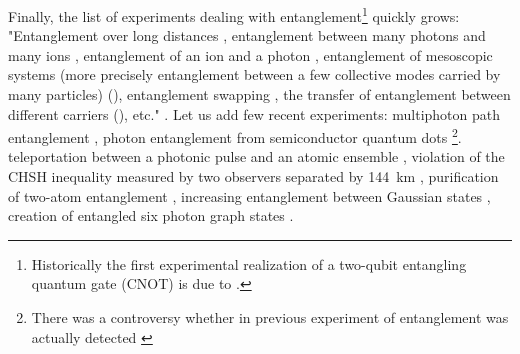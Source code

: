 \documentclass[rmp,12pt,preprint]{revtex4-2}
\begin{document}
Finally, the list of experiments dealing with
entanglement\footnote{Historically the first experimental realization
  of a two-qubit entangling quantum gate (CNOT) is due to
  \cite{WinelandFirstGate}.} quickly grows: "Entanglement over long
distances \cite {TittelBGZ1,TittelBGZ2,13,WeihsRWZ,33}, entanglement
between many photons \cite{34} and many ions \cite{35}, entanglement
of an ion and a photon \cite {36,37}, entanglement of mesoscopic
systems (more precisely entanglement between a few collective modes
carried by many particles) (\cite {38,39,40G}), entanglement swapping
\cite {exp_ent_swapping,42}, the transfer of entanglement between
different carriers (\cite {44}), etc." \cite {NG}. Let us add few
recent experiments: multiphoton path entanglement \cite {EisenbergHKB},
photon entanglement from semiconductor quantum dots
\cite{Akopian2006}\footnote{There was a controversy
whether in previous experiment of \cite{Stevenson-nature2005} entanglement was  actually detected  \cite{Avron-comment}}.
teleportation between a photonic pulse and an atomic ensemble
\cite{Polzik2006-foton-atom}, violation of the CHSH inequality
measured by two observers separated by 144~km \cite {144km}, purification of two-atom entanglement \cite {ReichleLKBBJLOSW2006},  increasing entanglement between Gaussian states
\cite{OurjoumtsevDTG2007}, creation of entangled six photon graph states \cite {LuZGGZSGYP2007}.
\end{document}
